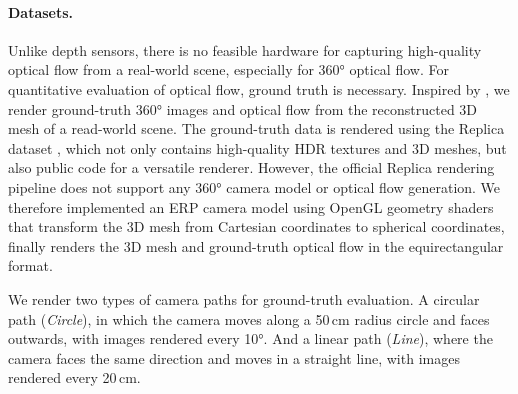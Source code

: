 \paragraph{Datasets.}
%
%
%
Unlike depth sensors, %
there is no feasible hardware for capturing high-quality optical flow from a real-world scene, especially for 360° optical flow.
%
For quantitative evaluation of optical flow, ground truth is necessary.
%
Inspired by \citet{ShugrLKLSSF2019}, we render ground-truth 360° images and optical flow from the reconstructed 3D mesh of a read-world scene.
The ground-truth data is rendered using the Replica dataset \cite{StrauWMCWGEMRVCYBYPYZLCBGMPSBSNGLN2019}, which not only contains high-quality HDR textures and 3D meshes, but also public code for a versatile renderer.
%
However, the official Replica rendering pipeline does not support any 360° camera model or optical flow generation.
We therefore implemented an ERP camera model using OpenGL geometry shaders that transform the 3D mesh from Cartesian coordinates to spherical coordinates, finally renders the 3D mesh and ground-truth optical flow in the equirectangular format.


We render two types of camera paths for ground-truth evaluation.
A circular path (\emph{Circle}), in which the camera moves along a 50\,cm radius circle and faces outwards, with images rendered every 10°.
And a linear path (\emph{Line}), where the camera faces the same direction and moves in a straight line, with images rendered every 20\,cm.


